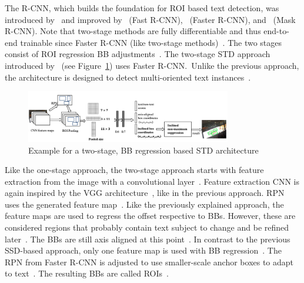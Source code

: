 The R-CNN, which builds the foundation for \ac{ROI} based text detection, was introduced
by~\cite{girshick_rich_2014} and improved by~\cite{girshick_fast_2015} (Fast
R-CNN),~\cite{ren_faster_2015} (Faster R-CNN), and~\cite{he_mask_2018} (Mask R-CNN).
Note that two-stage methods are fully differentiable and thus end-to-end trainable since
Faster R-CNN (like two-stage methods)~\citep{ren_faster_2015,long_scene_2021}.
The two stages consist of \ac{ROI} regression \ac{BB}
adjustments~\citep{jiang_r2cnn_2017, ren_faster_2015}.
The two-stage \ac{STD} approach introduced by~\cite{jiang_r2cnn_2017} (see
Figure~\ref{fig:STD-segfree-rcnn}) uses Faster R-CNN.\
Unlike the previous approach, the architecture is designed to detect multi-oriented text
instances~\citep{jiang_r2cnn_2017,liao_textboxes_2017}.
\begin{figure}[ht]
    \centering
    \includegraphics[width=0.8\textwidth]{img/STD-seg-free-Jiang-R2CNN-2017.png}
    \caption[Two-stage, BB regression based STD architecture]{%
        Example for a two-stage, BB regression based STD
        architecture~\citep{jiang_r2cnn_2017}\label{fig:STD-segfree-rcnn}
    }
\end{figure}
Like the one-stage approach, the two-stage approach starts with feature extraction from the
image with a convolutional layer~\citep{jiang_r2cnn_2017}.
Feature extraction \ac{CNN} is again inspired by the VGG architecture~\citep{jiang_r2cnn_2017},
like in the previous approach.
\ac{RPN} uses the generated feature map~\citep{jiang_r2cnn_2017}.
Like the previously explained approach, the feature maps are used to regress the offset
respective to \acp{BB}.
However, these are considered regions that probably contain text subject to change and
be refined later~\citep{jiang_r2cnn_2017,lu_mimicdet_2020}.
The \acp{BB} are still axis aligned at this point~\citep{jiang_r2cnn_2017}.
In contrast to the previous \ac{SSD}-based approach, only one feature map is used with
\ac{BB} regression~\citep{jiang_r2cnn_2017}.
The \ac{RPN} from Faster R-CNN is adjusted to use smaller-scale anchor boxes to adapt to
text~\citep{jiang_r2cnn_2017}.
The resulting \acp{BB} are called \acp{ROI}~\citep{ren_faster_2015,jiang_r2cnn_2017}.
